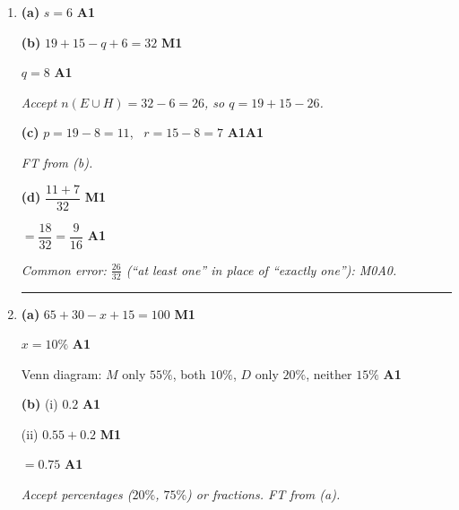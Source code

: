 \documentclass[12pt, twoside]{article}
\begin{document}
\begin{enumerate}[itemsep=0.3cm]
\newpage

\item[8.] [Maximum mark: 7]

\textbf{(a)} $s = 6$ \hfill \textbf{A1}

\textbf{(b)} $19 + 15 - q + 6 = 32$ \hfill \textbf{M1}

$q = 8$ \hfill \textbf{A1}

\emph{Accept $n(E \cup H) = 32 - 6 = 26$, so $q = 19 + 15 - 26$.}

\textbf{(c)} $p = 19 - 8 = 11$, \ $r = 15 - 8 = 7$ \hfill \textbf{A1A1}

\emph{FT from (b).}

\textbf{(d)} $\dfrac{11 + 7}{32}$ \hfill \textbf{M1}

$= \dfrac{18}{32} = \dfrac{9}{16}$ \hfill \textbf{A1}

\emph{Common error: $\frac{26}{32}$ (``at least one'' in place of
``exactly one''): M0A0.}

\bigskip \hrule \bigskip

\item[9.] [Maximum mark: 6]

\textbf{(a)} $65 + 30 - x + 15 = 100$ \hfill \textbf{M1}

$x = 10\%$ \hfill \textbf{A1}

Venn diagram: $M$ only $55\%$, both $10\%$, $D$ only $20\%$, neither $15\%$
\hfill \textbf{A1}

\textbf{(b)} (i) $0.2$ \hfill \textbf{A1}

(ii) $0.55 + 0.2$ \hfill \textbf{M1}

$= 0.75$ \hfill \textbf{A1}

\emph{Accept percentages ($20\%$, $75\%$) or fractions. FT from (a).}

\end{enumerate}
\end{document}
